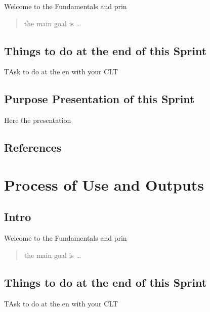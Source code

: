 \documentclass[
]{book}
\begin{document}
Welcome to the Fundamentals and prin

\begin{quote}
the main goal is \ldots{}
\end{quote}

\hypertarget{things-to-do-at-the-end-of-this-sprint-1}{%
\section{Things to do at the end of this Sprint}\label{things-to-do-at-the-end-of-this-sprint-1}}

TAsk to do at the en with your CLT

\hypertarget{purpose-presentation-of-this-sprint-1}{%
\section{Purpose Presentation of this Sprint}\label{purpose-presentation-of-this-sprint-1}}

Here the presentation

\hypertarget{references-2}{%
\section{References}\label{references-2}}

\hypertarget{process-of-use-and-outputs}{%
\chapter{Process of Use and Outputs}\label{process-of-use-and-outputs}}

\hypertarget{intro-4}{%
\section{Intro}\label{intro-4}}

Welcome to the Fundamentals and prin

\begin{quote}
the main goal is \ldots{}
\end{quote}

\hypertarget{things-to-do-at-the-end-of-this-sprint-2}{%
\section{Things to do at the end of this Sprint}\label{things-to-do-at-the-end-of-this-sprint-2}}

TAsk to do at the en with your CLT
\end{document}

